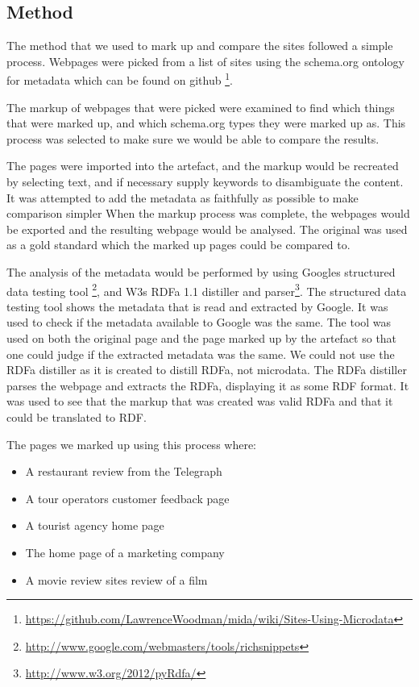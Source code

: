 \subsection{Method}
The method that we used to mark up and compare the sites followed a simple process.
Webpages were picked from a list of sites using the schema.org ontology for metadata which can be found on github
\footnote{\url{https://github.com/LawrenceWoodman/mida/wiki/Sites-Using-Microdata}}.

The markup of webpages that were picked were examined to find which things that were marked up,
and which schema.org types they were marked up as.
This process was selected to make sure we would be able to compare the results.

The pages were imported into the artefact, and the markup would be recreated by selecting text,
and if necessary supply keywords to disambiguate the content.
It was attempted to add the metadata as faithfully as possible to make comparison simpler
When the markup process was complete, the webpages would be exported and the resulting webpage would be analysed.
The original was used as a gold standard which the marked up pages could be compared to.

The analysis of the metadata would be performed by using Googles structured data testing tool
\footnote{\url{http://www.google.com/webmasters/tools/richsnippets}},
and W3s RDFa 1.1 distiller and parser\footnote{\url{http://www.w3.org/2012/pyRdfa/}}.
The structured data testing tool shows the metadata that is read and extracted by Google.
It was used to check if the metadata available to Google was the same.
The tool was used on both the original page and the page marked up by the artefact so that one could judge if the
extracted metadata was the same.
We could not use the RDFa distiller as it is created to distill RDFa, not microdata.
The RDFa distiller parses the webpage and extracts the RDFa, displaying it as some RDF format.
It was used to see that the markup that was created was valid RDFa and that it could be translated to RDF.

The pages we marked up using this process where:
\begin{itemize}
	\item A restaurant review from the Telegraph
	\item A tour operators customer feedback page
	\item A tourist agency home page
	\item The home page of a marketing company
	\item A movie review sites review of a film
\end{itemize}

